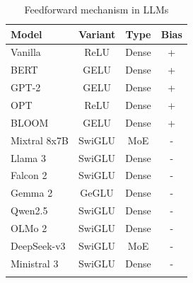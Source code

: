 \documentclass[namedate,webpdf,imanum]{ima-authoring-template}
\numberwithin{equation}{section}
\begin{document}
\begin{table}[th]
\caption{Feedforward mechanism in LLMs}
\label{tab:LLM-FFN}
\begin{tabular}{@{}lccc@{}}
\toprule
Model & Variant & Type & Bias \\
\midrule
Vanilla \citep{vaswani2017attention}  & ReLU   & Dense & + \\
BERT \citep{devlin2019bert}           & GELU   & Dense & + \\
GPT-2 \citep{radford2019language}     & GELU   & Dense & + \\
OPT \citep{zhang2022opt}              & ReLU   & Dense & + \\
BLOOM \citep{scao2022bloom}           & GELU   & Dense & + \\
Mixtral 8x7B \citep{jiang2024mixtral} & SwiGLU & MoE   & - \\
Llama 3 \citep{grattafiori2024llama}  & SwiGLU & Dense & - \\
Falcon 2 \citep{malartic2024falcon2}  & SwiGLU & Dense & - \\
Gemma 2 \citep{riviere2024gemma}      & GeGLU  & Dense & - \\
Qwen2.5 \citep{yang2024qwen25}        & SwiGLU & Dense & - \\
OLMo 2 \citep{walsh20252}             & SwiGLU & Dense & - \\
DeepSeek-v3 \citep{liu2024deepseek}   & SwiGLU & MoE   & - \\
Ministral 3 \citep{liu2026mistral}    & SwiGLU & Dense & - \\
\botrule
\end{tabular}
\end{table}
\end{document}
